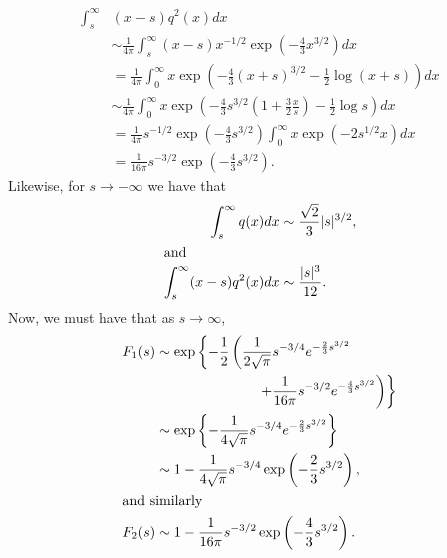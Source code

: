 \documentclass[final]{IEEEtran} %
\begin{document}
\begin{align*}
    \int_s^\infty & (x - s) q^2(x) dx \\
        & \sim \frac{1}{4 \pi}
              \int_s^\infty
                  (x - s)
                  x^{-1/2}
                  \exp\left( -\frac{4}{3} x^{3/2} \right)
                  dx \\
        &= \frac{1}{4 \pi}
           \int_0^\infty
               x
               \exp\left(
                   -\frac{4}{3} (x + s)^{3/2}
                   -\frac{1}{2} \log( x + s )
               \right)
               dx \\
        &\sim \frac{1}{4 \pi}
              \int_0^\infty
              x
              \exp\left(
                  -\frac{4}{3}s^{3/2}
                  \left( 1 + \frac{3}{2} \frac{x}{s} \right)
                  - \frac{1}{2} \log s
              \right)
              dx \\
        &= \frac{1}{4 \pi}
           s^{-1/2}
           \exp\left( -\frac{4}{3} s^{3/2} \right)
           \int_0^\infty
                x
                \exp\left(
                    -2 s^{1/2} x
                \right)
                dx \\
        &= \frac{1}{16 \pi}
           s^{-3/2}
           \exp\left( -\frac{4}{3} s^{3/2} \right).
\end{align*}
Likewise, for $s \to -\infty$ we have that
\begin{align*}
    \int_s^\infty q(x) dx &\sim \frac{\sqrt{2}}{3} |s|^{3/2}, \\
\intertext{and}
    \int_s^\infty (x - s) q^2(x) dx &\sim \frac{|s|^3}{12}.
\end{align*}
Now, we must have that as $s\to\infty$,
\begin{align*}
    F_1(s)
        &\sim \exp\left\{
                  -\frac{1}{2}
                  \left(
                      \frac{1}{2 \sqrt{\pi}}
                      s^{-3/4}
                      e^{-\frac{2}{3} s^{3/2}}
                      \right. \right.
                      \\ & \qquad \qquad \qquad \quad\,
                      \left. \left.
                      +
                      \frac{1}{16 \pi}
                      s^{-3/2}
                      e^{-\frac{4}{3} s^{3/2}}
                  \right)
              \right\} \\
        &\sim \exp\left\{
                   -
                   \frac{1}{4 \sqrt{\pi}}
                   s^{-3/4}
                   e^{-\frac{2}{3} s^{3/2}}
              \right\} \\
        &\sim 1
              -
              \frac{1}{4 \sqrt{\pi}}
              s^{-3/4}
              \exp\left( -\frac{2}{3} s^{3/2} \right), \\
\intertext{and similarly}
    F_2(s) &\sim 1
                 -
                 \frac{1}{16 \pi}
                 s^{-3/2}
                 \exp\left( -\frac{4}{3} s^{3/2} \right).
\end{align*}
\end{document}
